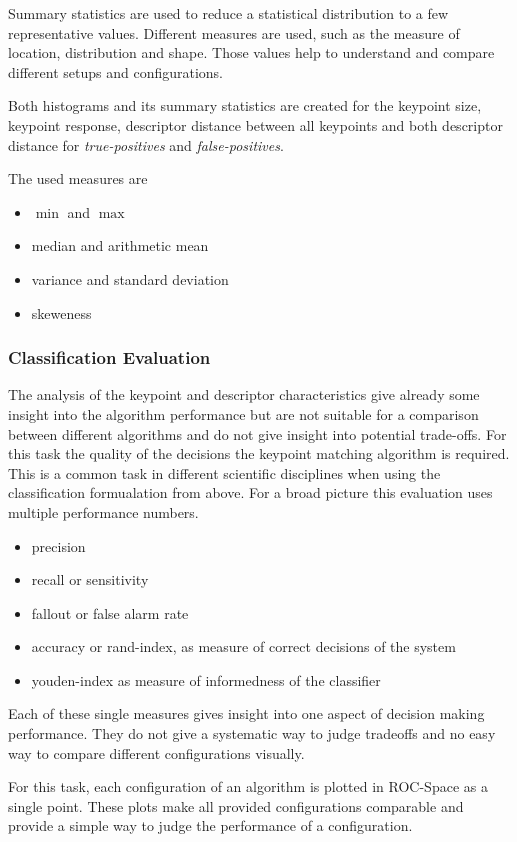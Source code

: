 Summary statistics are used to reduce a statistical distribution to a few representative values.
Different measures are used, such as the measure of location, distribution and shape.
Those values help to understand and compare different setups and configurations.

Both histograms and its summary statistics are created for the keypoint size, keypoint response, descriptor distance between all keypoints and both descriptor distance for \emph{true-positives} and \emph{false-positives}.

The used measures are
\begin{itemize}
    \item $\min$ and $\max$
    \item median and arithmetic mean
    \item variance and standard deviation
    \item skeweness
\end{itemize}

\subsubsection{Classification Evaluation}

The analysis of the keypoint and descriptor characteristics give already some insight into the algorithm performance but are not suitable for a comparison between different algorithms and do not give insight into potential trade-offs.
For this task the quality of the decisions the keypoint matching algorithm is required.
This is a common task in different scientific disciplines when using the classification formualation from above.
For a broad picture this evaluation uses multiple performance numbers.

\begin{itemize}
    \item precision
    \item recall or sensitivity
    \item fallout or false alarm rate
    \item accuracy or rand-index, as measure of correct decisions of the system
    \item youden-index as measure of informedness of the classifier
\end{itemize}

Each of these single measures gives insight into one aspect of decision making performance.
They do not give a systematic way to judge tradeoffs and no easy way to compare different configurations visually.

For this task, each configuration of an algorithm is plotted in \gls{ROC}-Space as a single point.
These plots make all provided configurations comparable and provide a simple way to judge the performance of a configuration.

